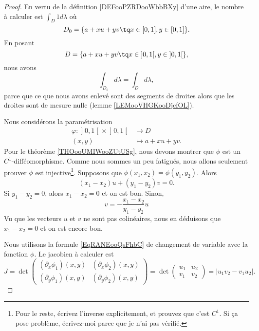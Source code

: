 \begin{proof}
	En vertu de la définition \ref{DEFooPZRDooWbbBXy} d'une aire, le nombre à calculer est \( \int_D1d\lambda\) où
	\begin{equation}
		D_0=\{ a+xu+yv\tq x\in \mathopen[ 0 , 1 \mathclose], y\in\mathopen[ 0 , 1 \mathclose] \}.
	\end{equation}
	En posant
	\begin{equation}
		D=\{ a+xu+yv\tq x\in \mathopen] 0 , 1 \mathclose[, y\in\mathopen] 0 , 1 \mathclose[ \},
	\end{equation}
	nous avons
	\begin{equation}
		\int_{D_0}d\lambda=\int_Dd\lambda,
	\end{equation}
	parce que ce que nous avons enlevé sont des segments de droites alors que les droites sont de mesure nulle (lemme \ref{LEMooVHGKooDjcfOL}).

	Nous considérons la paramétrisation
	\begin{equation}
		\begin{aligned}
			\varphi\colon \mathopen] 0 , 1 \mathclose[\times \mathopen] 0 , 1 \mathclose[ & \to D            \\
			(x,y)                                                                         & \mapsto a+xu+yv.
		\end{aligned}
	\end{equation}
	Pour le théorème \ref{THOooUMIWooZUtUSg}, nous devons montrer que \( \phi\) est un \( C^1\)-difféomorphisme. Comme nous sommes un peu fatigués, nous allons seulement prouver \( \phi\) est injective\footnote{Pour le reste, écrivez l'inverse explicitement, et prouvez que c'est \( C^1\). Si ça pose problème, écrivez-moi parce que je n'ai pas vérifié.}. Supposons que \( \phi(x_1, x_2)=\phi(y_1, y_2)\). Alors
	\begin{equation}
		(x_1-x_2)u+(y_1-y_2)v=0.
	\end{equation}
	Si \( y_1-y_2=0\), alors \( x_1-x_2=0\) et on est bon. Sinon,
	\begin{equation}
		v=-\frac{ x_1-x_2 }{ y_1-y_2 }u
	\end{equation}
	Vu que les vecteurs \( u\) et \( v\) ne sont pas colinéaires, nous en déduisons que \( x_1-x_2=0\) et on est encore bon.

	Nous utilisons la formule \eqref{EqRANEooQsFhbC} de changement de variable avec la fonction \( \phi\). Le jacobien à calculer est
	\begin{equation}
		J=\det\begin{pmatrix}
			(\partial_x\phi_1)(x,y) & (\partial_x\phi_2)(x,y) \\
			(\partial_y\phi_1)(x,y) & (\partial_y\phi_2)(x,y)
		\end{pmatrix}=\det\begin{pmatrix}
			u_1 & u_2 \\
			v_1 & v_2
		\end{pmatrix}=| u_1v_2-v_1u_2 |.
	\end{equation}


\end{proof}
